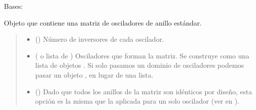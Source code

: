 \documentclass[letterpaper,10pt,english]{sphinxmanual}
\begin{document}
\begin{fulllineitems}
\label{\detokenize{fpga.ring_osc:fpga.ring_osc.StdMatrix}}
\pysigstartsignatures
{}
\pysigstopsignatures
\sphinxAtStartPar
Bases: 

\sphinxAtStartPar
Objeto que contiene una matriz de osciladores de anillo estándar.
\begin{quote}\begin{description}
\begin{itemize}
\item {} 
\sphinxAtStartPar
{} () \textendash{} Número de inversores de cada oscilador.

\item {} 
\sphinxAtStartPar
{} ({\hyperref[\detokenize{fpga.ring_osc:fpga.ring_osc.Dominio}]{}} o lista de ) \textendash{} Osciladores que forman la matriz. Se construye como una lista de objetos . Si solo pasamos un dominio de osciladores podemos pasar un objeto , en lugar de una lista.

\item {} 
\sphinxAtStartPar
{} (\sphinxstyleliteralemphasis{\sphinxupquote{ | }}\sphinxstyleliteralemphasis{\sphinxupquote{(}}\sphinxstyleliteralemphasis{\sphinxupquote{)}}) \textendash{} Dado que todos los anillos de la matriz son idénticos por diseño, esta opción es la misma que la aplicada para un solo oscilador (ver  en {\hyperref[\detokenize{fpga.ring_osc:fpga.ring_osc.StdRing}]{}}).


\end{itemize}
\end{description}
\end{quote}
\end{fulllineitems}
\end{document}
